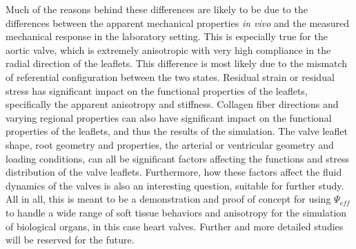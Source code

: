     Much of the reasons behind these differences are likely to be due to the differences between the apparent mechanical properties \textit{in vivo} and the measured mechanical response in the laboratory setting. This is especially true for the aortic valve, which is extremely anisotropic with very high compliance in the radial direction of the leaflets. This difference is most likely due to the mismatch of referential configuration between the two states. Residual strain or residual stress has significant impact on the functional properties of the leaflets, specifically the apparent anisotropy and stiffness. Collagen fiber directions and varying regional properties can also have significant impact on the functional properties of the leaflets, and thus the results of the simulation. The valve leaflet shape, root geometry and properties, the arterial or ventricular geometry and loading conditions, can all be significant factors affecting the functions and stress distribution of the valve leaflets. Furthermore, how these factors affect the fluid dynamics of the valves is also an interesting question, suitable for further study. All in all, this is meant to be a demonstration and proof of concept for using $\Psi_{eff}$ to handle a wide range of soft tissue behaviors and anisotropy for the simulation of biological organs, in this case heart valves. Further and more detailed studies will be reserved for the future.  
  

    
    

